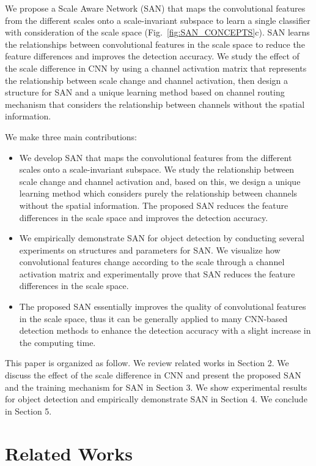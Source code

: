 \documentclass[runningheads]{llncs}
\begin{document}
We propose a Scale Aware Network (SAN) that maps the convolutional features from the different scales onto a scale-invariant subspace to learn a single classifier with consideration of the scale space (Fig.~\ref{fig:SAN_CONCEPTS}c).
SAN learns the relationships between convolutional features in the scale space to reduce the feature differences and improves the detection accuracy.
We study the effect of the scale difference in CNN by using a channel activation matrix that represents the relationship between scale change and channel activation,
then design a structure for SAN and a unique learning method based on channel routing mechanism that considers the relationship between channels without the spatial information.

We make three main contributions:
\begin{itemize}[leftmargin=+.4in,label=$\bullet$]
	\item We develop SAN that maps the convolutional features from the different scales onto a scale-invariant subspace.
	We study the relationship between scale change and channel activation and, based on this,
	we design a unique learning method which considers purely the relationship between channels without the spatial information.
	The proposed SAN reduces the feature differences in the scale space and improves the detection accuracy.

	\item We empirically demonstrate SAN for object detection by conducting several experiments on structures and parameters for SAN.
	We visualize how convolutional features change according to the scale through a channel activation matrix and
	experimentally prove that SAN reduces the feature differences in the scale space.


	\item The proposed SAN essentially improves the quality of convolutional features in the scale space,
	thus it can be generally applied to many CNN-based detection methods to enhance the detection accuracy with a slight increase in the computing time.
\end{itemize}

This paper is organized as follow.
We review related works in Section 2.
We discuss the effect of the scale difference in CNN and present the proposed SAN and the training mechanism for SAN in Section 3.
We show experimental results for object detection and empirically demonstrate SAN in Section 4.
We conclude in Section 5.

\section{Related Works}
\end{document}
